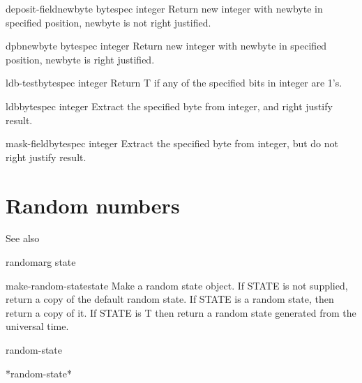 \begin{function}{deposit-field}{newbyte bytespec integer}{}{}
  Return new integer with newbyte in specified position, newbyte is not right justified.
\end{function}

\begin{function}{dpb}{newbyte bytespec integer}{}{}
  Return new integer with newbyte in specified position, newbyte is right justified.
\end{function}

\begin{function}{ldb-test}{bytespec integer}{}{}
  Return T if any of the specified bits in integer are 1's.
\end{function}

\begin{accessor}{ldb}{bytespec integer}{}{}
  Extract the specified byte from integer, and right justify result.
\end{accessor}

\begin{accessor}{mask-field}{bytespec integer}{}{}
  Extract the specified byte from integer,  but do not right justify result.
\end{accessor}

\section{Random numbers}
\label{sec:random-numbers}

See also 

\begin{function}{random}{arg \op state}{}{}
  
\end{function}

\begin{function}{make-random-state}{\op state}{}{}
  Make a random state object. If STATE is not supplied, return a copy
  of the default random state. If STATE is a random state, then return a
  copy of it. If STATE is T then return a random state generated from
  the universal time.
\end{function}

\begin{class}{random-state}{}{}{}
  
\end{class}

\begin{variable}{*random-state*}{}{}{}
  
\end{variable}

